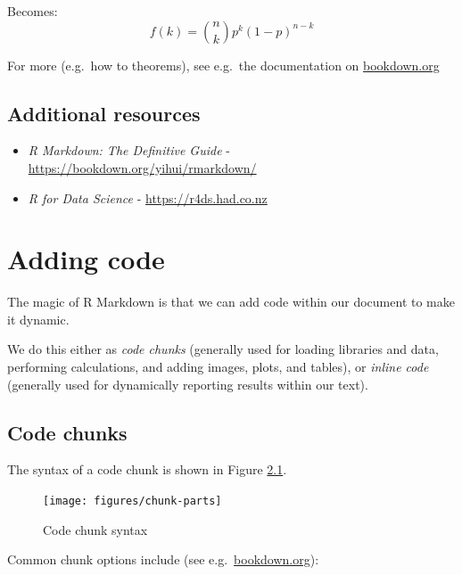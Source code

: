 \documentclass[a4paper, twoside]{templates/ociamthesis}
\begin{document}
Becomes:
\begin{equation}
f\left(k\right)=\binom{n}{k}p^k\left(1-p\right)^{n-k}
\label{eq:binom}
\end{equation}

For more (e.g.~how to theorems), see e.g.~the documentation on \href{https://bookdown.org/yihui/bookdown/markdown-extensions-by-bookdown.html\#equations}{bookdown.org}

\hypertarget{additional-resources}{%
\section{Additional resources}\label{additional-resources}}

\begin{itemize}
\item
  \emph{R Markdown: The Definitive Guide} - \url{https://bookdown.org/yihui/rmarkdown/}
\item
  \emph{R for Data Science} - \url{https://r4ds.had.co.nz}
\end{itemize}

\hypertarget{code}{%
\chapter{Adding code}\label{code}}

\minitoc 

The magic of R Markdown is that we can add code within our document to make it dynamic.

We do this either as \emph{code chunks} (generally used for loading libraries and data, performing calculations, and adding images, plots, and tables), or \emph{inline code} (generally used for dynamically reporting results within our text).

\hypertarget{code-chunks}{%
\section{Code chunks}\label{code-chunks}}

The syntax of a code chunk is shown in Figure \ref{fig:chunk-parts}.

\begin{figure}
\texttt{[image: figures/chunk-parts]} \caption{Code chunk syntax}\label{fig:chunk-parts}
\end{figure}

Common chunk options include (see e.g.~\href{https://bookdown.org/yihui/rmarkdown/r-code.html}{bookdown.org}):
\end{document}
